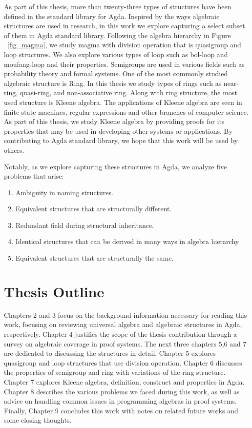 As part of this thesis, more than twenty-three types of structures have been
defined in the standard library for Agda. Inspired by the ways algebraic
structures are used in research, in this work we explore capturing a select
subset of them in Agda standard library. Following the algebra hierarchy in
Figure ~\ref{fig_magma}, we study magma with division operation that is
quasigroup and loop structures. We also explore various types of loop such as
bol-loop and moufang-loop and their properties. Semigroups are used in various
fields such as probability theory and formal systems. One of the most commonly
studied algebraic structure is Ring. In this thesis we study types of rings such
as near-ring, quasi-ring, and non-associative ring. Along with ring structure,
the most used structure is Kleene algebra. The applications of Kleene algebra
are seen in finite state machines, regular expressions and other branches of
computer science. As part of this thesis, we study Kleene algebra by providing
proofs for its properties that may be used in developing other systems or
applications. By contributing to Agda standard library, we hope that this work
will be used by others. 

Notably, as we explore capturing these structures in Agda, we analyze five
problems that arise:
\begin{enumerate}
\item Ambiguity in naming structures.
\item Equivalent structures that are structurally different.
\item Redundant field during structural inheritance.
\item Identical structures that can be derived in many ways in algebra hierarchy
\item Equivalent structures that are structurally the same.
\end{enumerate}

\section{Thesis Outline}
Chapters 2 and 3 focus on the background information necessary for reading this
work, focusing on reviewing universal algebra and algebraic structures in Agda,
respectively. Chapter 4 justifies the scope of the thesis contribution through a
survey on algebraic coverage in proof systems. The next three chapters 5,6 and 7
are dedicated to discussing the structures in detail. Chapter 5 explores
quasigroup and loop structures that use division operation. Chapter 6 discusses
the properties of semigroup and ring with variations of the ring structure. Chapter
7 explores Kleene algebra, definition, construct and properties in Agda. Chapter
8 describes the various problems we faced during this work, as well as advice on
handling common issues in programming algebras in proof systems. Finally,
Chapter 9 concludes this work with notes on related future works and some
closing thoughts.
